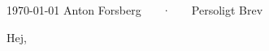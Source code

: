 \documentclass[11pt, a4paper]{awesome-cv}
\begin{document}
\makecvheader[R]

\makecvfooter
  {\today}
  {Anton Forsberg ~~~·~~~ Persoligt Brev}
  {}

\makelettertitle

\begin{cvletter}

{\fontsize{13}{14}\selectfont
\color{Why}


Hej,
\newline


}
\end{cvletter}


\makeletterclosing
\end{document}
